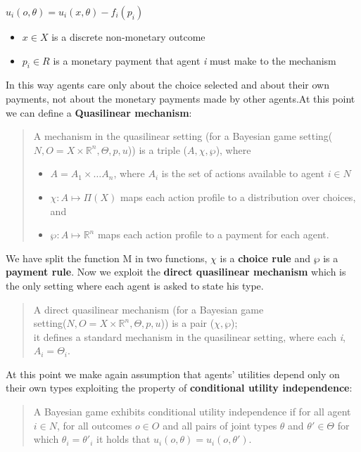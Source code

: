 \documentclass{article}
\begin{document}
{\begin{center}
    $u_i(o,\theta) = u_i(x,\theta) - f_i(p_i)$
    \begin{itemize}
        \item $x \in X$ is a discrete non-monetary outcome
        \item $p_i \in R$ is a monetary payment that agent \textit{i} must make to the mechanism
    \end{itemize}
\end{center}
In this way agents care only about the choice selected and about their own payments, not about the monetary payments made by other agents.\newpage At this point we can define a \textbf{Quasilinear mechanism}:
\begin{quote}
    A mechanism in the quasilinear setting (for a Bayesian game setting($N,O = X \times \mathbb{R}^n,\Theta,p,u$)) is a triple ($A,\chi,\wp$), where
    \begin{itemize}
        \item $A = A_1 \times \dots A_n$, where $A_i$ is the set of actions available to agent $i \in N$
        \item $\chi : A \mapsto \Pi(X)$ maps each action profile to a distribution over choices, and
        \item $\wp : A \mapsto \mathbb{R}^n$ maps each action profile to a payment for each agent.
    \end{itemize}
\end{quote}
We have split the function M in two functions, $\chi$ is a \textbf{choice rule} and $\wp$ is a \textbf{payment rule}. Now we exploit the \textbf{direct quasilinear mechanism} which is the only setting where each agent is asked to state his type.
\begin{quote}
    A direct quasilinear mechanism (for a Bayesian game\\ setting($N,O = X \times \mathbb{R}^n,\Theta,p,u$)) is a pair ($\chi,\wp$);\\ it defines a standard mechanism in the quasilinear setting, where each \textit{i}, $A_i = \Theta_i$.
\end{quote}
At this point we make again assumption that agents' utilities depend only on their own types exploiting the property of \textbf{conditional utility independence}:
\begin{quote}
    A Bayesian game exhibits conditional utility independence if for all agent $i \in N$, for all outcomes $o \in O$ and all pairs of joint types $\theta$ and $\theta' \in \Theta$ for which $\theta_i = \theta'_i$ it holds that $u_i(o,\theta) = u_i(o,\theta')$. 

\end{quote}}
\end{document}
